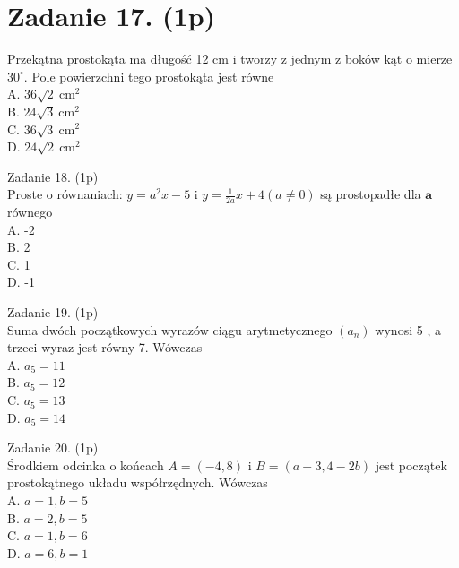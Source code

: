 \documentclass[10pt]{article}
\begin{document}
\section*{Zadanie 17. (1p)}
Przekątna prostokąta ma długość 12 cm i tworzy z jednym z boków kąt o mierze \(30^{\circ}\). Pole powierzchni tego prostokąta jest równe\\
A. \(36 \sqrt{2} \mathrm{~cm}^{2}\)\\
B. \(24 \sqrt{3} \mathrm{~cm}^{2}\)\\
C. \(36 \sqrt{3} \mathrm{~cm}^{2}\)\\
D. \(24 \sqrt{2} \mathrm{~cm}^{2}\)

Zadanie 18. (1p)\\
Proste o równaniach: \(y=a^{2} x-5\) i \(y=\frac{1}{2 a} x+4(a \neq 0)\) są prostopadłe dla \(\boldsymbol{a}\) równego\\
A. -2\\
B. 2\\
C. 1\\
D. -1

Zadanie 19. (1p)\\
Suma dwóch początkowych wyrazów ciągu arytmetycznego \(\left(a_{n}\right)\) wynosi 5 , a trzeci wyraz jest równy 7. Wówczas\\
A. \(a_{5}=11\)\\
B. \(a_{5}=12\)\\
C. \(a_{5}=13\)\\
D. \(a_{5}=14\)

Zadanie 20. (1p)\\
Środkiem odcinka o końcach \(A=(-4,8)\) i \(B=(a+3,4-2 b)\) jest początek prostokątnego układu współrzędnych. Wówczas\\
A. \(a=1, b=5\)\\
B. \(a=2, b=5\)\\
C. \(a=1, b=6\)\\
D. \(a=6, b=1\)
\end{document}
